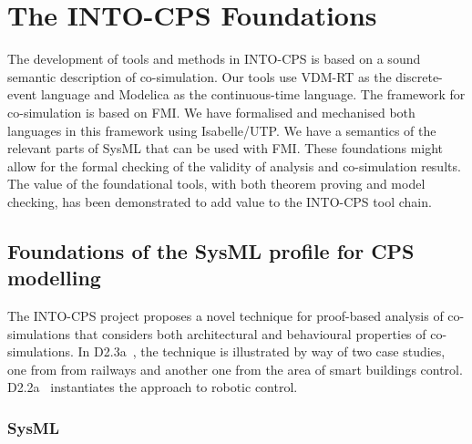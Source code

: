 
\newcommand{\CML}{\textsf{CML}}

\section{The INTO-CPS Foundations}\label{sec:foundations}



The development of tools and methods in INTO-CPS is based on a sound semantic description of co-simulation. Our tools use VDM-RT as the discrete-event language and Modelica as the continuous-time language. The framework for co-simulation is based on FMI. We have formalised and mechanised both languages in this framework using Isabelle/UTP. We have a semantics of the relevant parts of SysML that can be used with FMI. 
These foundations might allow for the formal checking of the validity of analysis and co-simulation results. 
The value of the foundational tools, with both theorem proving and model checking, has been demonstrated to add value to the INTO-CPS tool chain.

\subsection{Foundations of the SysML profile for CPS modelling}

The INTO-CPS project proposes a novel technique for proof-based analysis of co-simulations that considers both architectural and behavioural properties of co-simulations. In D2.3a~\cite{INTO-CPS-D2.3a-2017}, the technique is illustrated by way of two case studies, one from from railways and another one from the area of smart buildings control. D2.2a~\cite{INTO-CPS-D2.2a-2016} instantiates the approach to robotic control.

\subsubsection{SysML}

